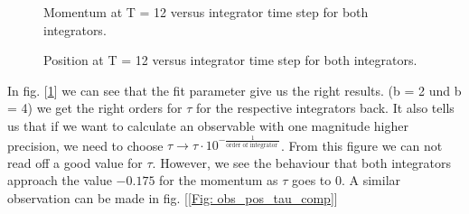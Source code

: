 \documentclass[11pt,a4paper]{article}
\begin{document}
\begin{figure}[H]
\centering
\caption{Momentum at T = 12 versus integrator time step for both integrators.}
\label{Fig: obs_mom_tau_comp}
\end{figure}

\begin{figure}[H]
\centering
\caption{Position at T = 12 versus integrator time step for both integrators.}
\label{Fig: obs_pos_tau_comp}
\end{figure} 


In fig. [\ref{Fig: obs_mom_tau_comp}] we can see that the fit parameter give us
the right results. (b = 2 und b = 4) we get the right orders for $\tau$ for the
respective integrators back. It also tells us that if we want to calculate an
observable with one magnitude higher precision, we need to choose $\tau
\rightarrow \tau \cdot 10^{-\frac{1}{\text{order of integrator }}} $. From this
figure we can not read off a good value for $\tau$. However, we see the
behaviour that both integrators approach the value $-0.175$ for the momentum as
$\tau$ goes to 0. A similar observation can be made in fig.  [\ref{Fig:
obs_pos_tau_comp}]
\end{document}
